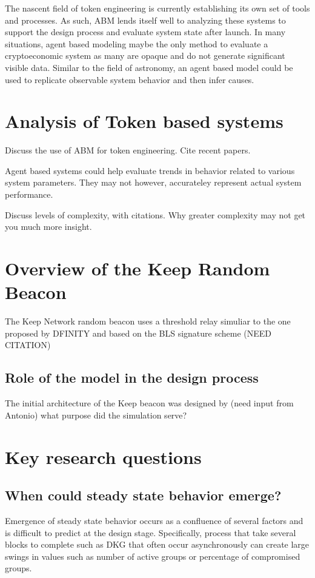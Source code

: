 \documentclass[conference]{IEEEtran}
\begin{document}
The nascent field of token engineering is currently establishing its own set 
of tools and processes. As such, ABM lends itself well to analyzing these systems
to support the design process and evaluate system state after launch. In many situations,
agent based modeling maybe the only method to evaluate a cryptoeconomic system as many are
opaque and do not generate significant visible data. Similar to the field of astronomy, an
agent based model could be used to replicate observable system behavior and then infer
causes. 

\section{Analysis of Token based systems}


Discuss the use of ABM for token engineering. Cite recent papers.

Agent based systems could help evaluate trends in behavior related to
various system parameters. They may not however, accurateley represent 
actual system performance. 

Discuss levels of complexity, with citations. Why greater complexity may
not get you much more insight.

\section{Overview of the Keep Random Beacon}
The Keep Network random beacon uses a threshold relay simuliar to the one proposed
by DFINITY and based on the BLS signature scheme \cite{} (NEED CITATION)

\subsection{Role of the model in the design process}
The initial architecture of the Keep beacon was designed by (need input from Antonio)
what purpose did the simulation serve?

\section{Key research questions}
\subsection{When could steady state behavior emerge?}
Emergence of steady state behavior occurs as a confluence of several factors and is difficult
to predict at the design stage. Specifically, process that take several blocks to complete 
such as DKG that often occur asynchronously can create large swings in values such as number of active
groups or percentage of compromised groups. 
\end{document}
